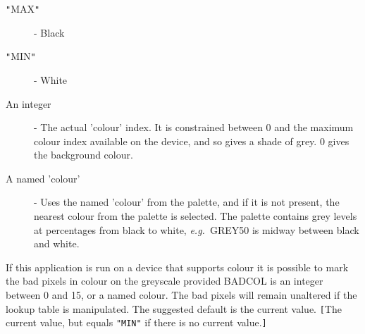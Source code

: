 {{{{         \begin{description}
           \item [{\tt "}MAX{\tt "}]  - Black
           \item [{\tt "}MIN{\tt "}]  - White
           \item [An integer] - The actual 'colour' index. It is constrained
                            between 0 and the maximum colour index
                            available on the device, and so gives a shade
                            of grey.  0 gives the background colour.
           \item [A named 'colour'] - Uses the named 'colour' from the
                            palette, and if it is not present, the nearest
                            colour from the palette is selected.  The
                            palette contains grey levels at percentages
                            from black to white, {\it e.g.}\ GREY50 is
                            midway between black and white.
         \end{description}
         If this application is run on a device that supports colour
         it is possible to mark the bad pixels in colour on the
         greyscale provided BADCOL is an integer between 0 and 15, or
         a named colour.  The bad pixels will remain unaltered if the
         lookup table is manipulated.  The suggested default is the
         current value. {\tt [}The current value, but equals {\tt "MIN"} if
         there is no current value.{\tt ]}
      }
      }}}
